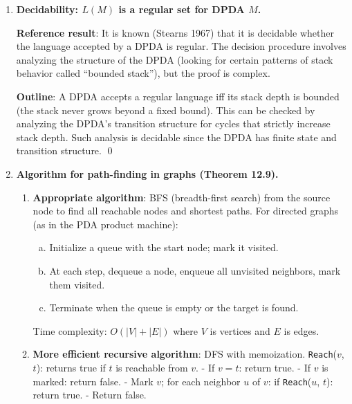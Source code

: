 \begin{enumerate}[{12.}1. ]
\begin{enumerate}
\item \textbf{Method for infinite $L(A)$}: BFS on $A$ to find all states reachable from $s_0$ and from which a final state is reachable. Among these ``useful'' states, check if there is a cycle (a state that appears twice on some accepting path). BFS/DFS to find a cycle among useful states. If yes, $L(A)$ is infinite; else finite. No DFA conversion needed. \qed
\end{enumerate}

\item \textbf{Decidability: $L(M)$ is a regular set for DPDA $M$.}

\textbf{Reference result}: It is known (Stearns 1967) that it is decidable whether the language accepted by a DPDA is regular. The decision procedure involves analyzing the structure of the DPDA (looking for certain patterns of stack behavior called ``bounded stack''), but the proof is complex.

\textbf{Outline}: A DPDA accepts a regular language iff its stack depth is bounded (the stack never grows beyond a fixed bound). This can be checked by analyzing the DPDA's transition structure for cycles that strictly increase stack depth. Such analysis is decidable since the DPDA has finite state and transition structure. \qed

\item \textbf{Algorithm for path-finding in graphs (Theorem 12.9).}

\begin{enumerate}
\item \textbf{Appropriate algorithm}: BFS (breadth-first search) from the source node to find all reachable nodes and shortest paths. For directed graphs (as in the PDA product machine):
\begin{enumerate}[a.]
\item Initialize a queue with the start node; mark it visited.
\item At each step, dequeue a node, enqueue all unvisited neighbors, mark them visited.
\item Terminate when the queue is empty or the target is found.
\end{enumerate}
Time complexity: $O(|V| + |E|)$ where $V$ is vertices and $E$ is edges.

\item \textbf{More efficient recursive algorithm}: DFS with memoization.
\texttt{Reach}($v$, $t$): returns true if $t$ is reachable from $v$.
- If $v = t$: return true.
- If $v$ is marked: return false.
- Mark $v$; for each neighbor $u$ of $v$: if \texttt{Reach}($u$, $t$): return true.
- Return false.


\end{enumerate}
\end{enumerate}

